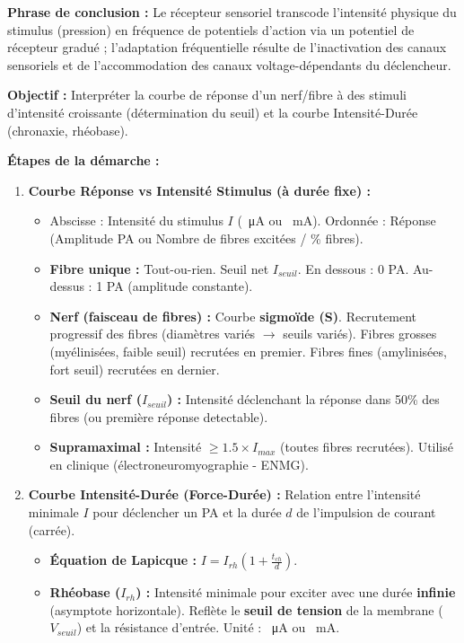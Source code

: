 \documentclass[11pt]{article}
\begin{document}
\begin{exoresolu}
\textbf{Phrase de conclusion :} Le récepteur sensoriel transcode l'intensité physique du stimulus (pression) en fréquence de potentiels d'action via un potentiel de récepteur gradué ; l'adaptation fréquentielle résulte de l'inactivation des canaux sensoriels et de l'accommodation des canaux voltage-dépendants du déclencheur.
\end{exoresolu}

\begin{methode}
\textbf{Objectif :} Interpréter la courbe de réponse d'un nerf/fibre à des stimuli d'intensité croissante (détermination du seuil) et la courbe Intensité-Durée (chronaxie, rhéobase).

\textbf{Étapes de la démarche :}
\begin{enumerate}
    \item \textbf{Courbe Réponse vs Intensité Stimulus (à durée fixe) :}
    \begin{itemize}
        \item Abscisse : Intensité du stimulus $I$ (\SI{}{\micro A} ou \SI{}{mA}). Ordonnée : Réponse (Amplitude PA ou Nombre de fibres excitées / \% fibres).
        \item \textbf{Fibre unique :} Tout-ou-rien. Seuil net $I_{seuil}$. En dessous : 0 PA. Au-dessus : 1 PA (amplitude constante).
        \item \textbf{Nerf (faisceau de fibres) :} Courbe \textbf{sigmoïde (S)}. Recrutement progressif des fibres (diamètres variés $\rightarrow$ seuils variés). Fibres grosses (myélinisées, faible seuil) recrutées en premier. Fibres fines (amylinisées, fort seuil) recrutées en dernier.
        \item \textbf{Seuil du nerf ($I_{seuil}$) :} Intensité déclenchant la réponse dans 50\% des fibres (ou première réponse detectable).
        \item \textbf{Supramaximal :} Intensité $\ge 1.5 \times I_{max}$ (toutes fibres recrutées). Utilisé en clinique (électroneuromyographie - ENMG).
    \end{itemize}
    \item \textbf{Courbe Intensité-Durée (Force-Durée) :} Relation entre l'intensité minimale $I$ pour déclencher un PA et la durée $d$ de l'impulsion de courant (carrée).
    \begin{itemize}
        \item \textbf{Équation de Lapicque :} $I = I_{rh} \left( 1 + \frac{t_{ch}}{d} \right)$.
        \item \textbf{Rhéobase ($I_{rh}$) :} Intensité minimale pour exciter avec une durée \textbf{infinie} (asymptote horizontale). Reflète le \textbf{seuil de tension} de la membrane ($V_{seuil}$) et la résistance d'entrée. Unité : \SI{}{\micro A} ou \SI{}{mA}.

\end{itemize}
\end{enumerate}
\end{methode}
\end{document}
